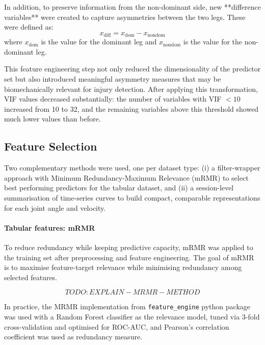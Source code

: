 In addition, to preserve information from the non-dominant side, new **difference variables** were created to capture asymmetries between the two legs. These were defined as:
\begin{equation}
    x_{\mathrm{diff}} = x_{\mathrm{dom}} - x_{\mathrm{nondom}}
\end{equation}
where $x_{\mathrm{dom}}$ is the value for the dominant leg and $x_{\mathrm{nondom}}$ is the value for the non-dominant leg.

This feature engineering step not only reduced the dimensionality of the predictor set but also introduced meaningful asymmetry measures that may be biomechanically relevant for injury detection. After applying this transformation, VIF values decreased substantially: the number of variables with VIF $< 10$ increased from 10 to 32, and the remaining variables above this threshold showed much lower values than before.

\subsection{Feature Selection}\label{subsec:method-feature-selection}
Two complementary methods were used, one per dataset type: (i) a filter-wrapper approach with Minimum Redundancy-Maximum Relevance (mRMR) to select best performing predictors for the tabular dataset, and (ii) a session-level summarisation of time-series curves to build compact, comparable representations for each joint angle and velocity.

\paragraph{Tabular features: mRMR}
To reduce redundancy while keeping predictive capacity, mRMR \citep{DING2005} was applied to the training set after preprocessing and feature engineering. The goal of mRMR is to maximise feature-target relevance while minimising redundancy among selected features.

\begin{equation}
TODO: EXPLAIN-MRMR-METHOD
\end{equation}

In practice, the MRMR implementation from \texttt{feature\_engine} python package was used with a Random Forest classifier as the relevance model, tuned via 3-fold cross-validation and optimised for ROC-AUC, and Pearson's correlation coefficient was used as redundancy measure.

